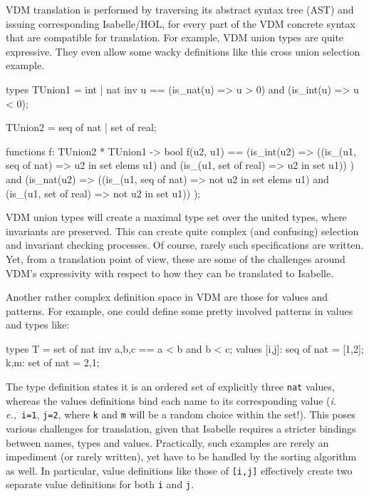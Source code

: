 \documentclass[runningheads,a4paper]{llncs}
\newcommand{\ie}{{\em i.\,e.,\/}}
\begin{document}
VDM translation is performed by traversing its abstract syntax tree (AST) and issuing corresponding Isabelle/HOL, for every part of the VDM concrete syntax that are compatible for translation. For example, VDM union types are quite expressive. They even allow some wacky definitions like this cross union selection example.
%
\begin{vdmsl}[frame=none,basicstyle=\ttfamily\scriptsize]
    types
        TUnion1 = int | nat
        inv u == (is_nat(u) => u > 0) and (is_int(u) => u < 0);

        TUnion2 = seq of nat | set of real;

    functions 
        f: TUnion2 * TUnion1 -> bool
        f(u2, u1) ==
            (is_int(u2) => 
                ((is_(u1, seq of nat) => u2 in set elems u1)
                  and
                 (is_(u1, set of real) => u2 in set u1))
            )
            and
            (is_nat(u2) => 
                ((is_(u1, seq of nat) => not u2 in set elems u1)
                  and
                 (is_(u1, set of real) => not u2 in set u1))
            );
\end{vdmsl}
%
VDM union types will create a maximal type set over the united types, where invariants are preserved. This can create quite complex (and confusing) selection and invariant checking processes. Of course, rarely such specifications are written. Yet, from a translation point of view, these are some of the challenges around VDM's expressivity with respect to how they can be translated to Isabelle. 

Another rather complex definition space in VDM are those for values and patterns. For example, one could define some pretty involved patterns in values and types like:
%
\begin{vdmsl}[frame=none,basicstyle=\ttfamily\scriptsize]
    types
        T = set of nat inv {a,b,c} == a < b and b < c;
    values 
        [i,j]: seq of nat = [1,2];
        {k,m}: set of nat = {2,1};
\end{vdmsl}
%
The type definition states it is an ordered set of explicitly three \verb'nat' values, whereas the values definitions bind each name to its corresponding value (\ie~\verb'i=1', \verb'j=2', where \verb'k' and \verb'm' will be a random choice within the set!). This poses various challenges for translation, given that Isabelle requires a stricter bindings between names, types and values. Practically, such examples are rerely an impediment (or rarely written), yet have to be handled by the sorting algorithm as well. In particular, value definitions like those of \verb'[i,j]' effectively create two separate value definitions for both \verb'i' and \verb'j'.   
\end{document}
